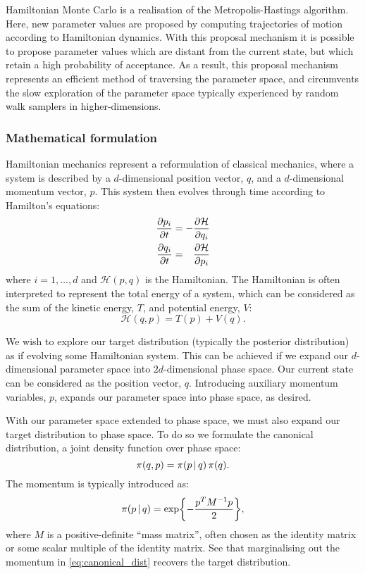 Hamiltonian Monte Carlo is a realisation of the Metropolis-Hastings algorithm. Here,
new parameter values are proposed by computing trajectories of motion according to
Hamiltonian dynamics. With this proposal mechanism it is possible to propose parameter
values which are distant from the current state, but which retain a high probability of
acceptance. As a result, this proposal mechanism represents an efficient method of
traversing the parameter space, and circumvents the slow exploration of the parameter
space typically experienced by random walk samplers in higher-dimensions.

\subsubsection{Mathematical formulation}

Hamiltonian mechanics represent a reformulation of classical mechanics, where a system is
described by a $d$-dimensional position vector, $q$, and a $d$-dimensional momentum
vector, $p$. This system then evolves through time according to Hamilton's
equations:
\begin{align}
  \begin{split}
    \pdv{p_i}{t} &= - \pdv{\mathcal{H}}{q_i}\\
    \pdv{q_i}{t} &= \hphantom{-} \pdv{\mathcal{H}}{p_i}
  \end{split}
\end{align}
where $i=1,\ldots,d$ and $\mathcal{H}(p, q)$ is the Hamiltonian. The
Hamiltonian is often interpreted to represent the total energy of a system, which can be
considered as the sum of the kinetic energy, $T$, and potential energy, $V$:
\begin{equation}
  \label{eq:hamiltonian_decomp}
  \mathcal{H}(q, p) = T(p) + V(q).
\end{equation}

We wish to explore our target distribution (typically the posterior distribution) as if
evolving some Hamiltonian system. This can be achieved if we expand our $d$-dimensional
parameter space into $2d$-dimensional phase space. Our current state can be considered as
the position vector, $q$. Introducing auxiliary momentum variables, $p$, expands
our parameter space into phase space, as desired.

With our parameter space extended to phase space, we must also expand our target
distribution to phase space. To do so we formulate the canonical distribution, a joint
density function over phase space:
\begin{equation}
  \label{eq:canonical_dist}
  \pi(q, p) = \pi(p \,|\, q) \, \pi(q).
\end{equation}
The momentum is typically introduced as:
\begin{equation}
  \pi(p \,|\, q) = \exp{-\frac{p^T M^{-1} p}{2}},
\end{equation}
where $M$ is a positive-definite ``mass matrix'', often chosen as the identity matrix or
some scalar multiple of the identity matrix. See that marginalising out the momentum in
\cref{eq:canonical_dist} recovers the target distribution.

